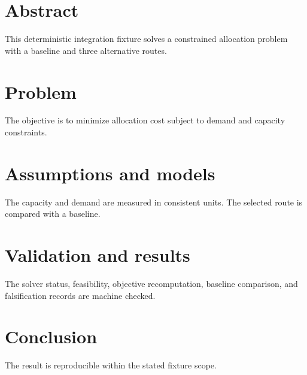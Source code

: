 \documentclass{article}
\begin{document}
\section*{Abstract}
This deterministic integration fixture solves a constrained allocation problem with a baseline and three alternative routes.
\section{Problem}
The objective is to minimize allocation cost subject to demand and capacity constraints.
\section{Assumptions and models}
The capacity and demand are measured in consistent units. The selected route is compared with a baseline.
\section{Validation and results}
The solver status, feasibility, objective recomputation, baseline comparison, and falsification records are machine checked.
\section{Conclusion}
The result is reproducible within the stated fixture scope. \cite{fixture-source}
\end{document}
